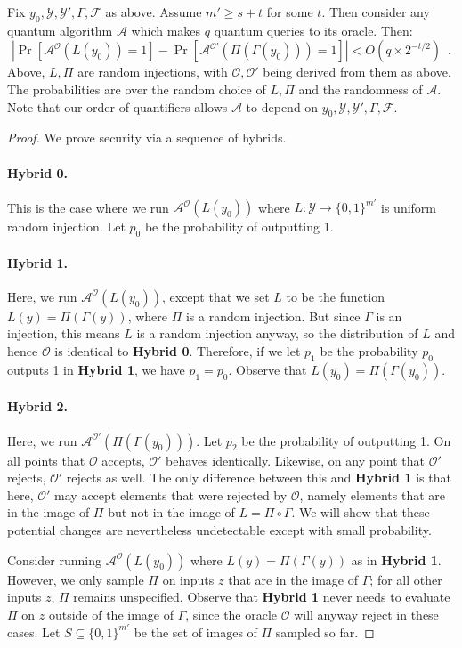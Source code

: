 \documentclass{article}\usepackage[a4paper,margin=20mm]{geometry}
\numberwithin{theorem}{section}
\numberwithin{equation}{section}
\newcommand{\As}{{\mathcal{A}}}
\newcommand{\Fs}{{\mathcal{F}}}
\newcommand{\Os}{{\mathcal{O}}}
\newcommand{\Ys}{{\mathcal{Y}}}
\begin{document}
\begin{lemma}\label{lem:ggamsim} Fix $y_0,\Ys,\Ys',\Gamma,\Fs$ as above. Assume $m'\geq s+t$ for some $t$. Then consider any quantum algorithm $\As$ which makes $q$ quantum queries to its oracle. Then:
	\[\left|\Pr\left[\As^{\Os}(L(y_0))=1\right]-\Pr\left[\As^{\Os'}(\Pi(\Gamma(y_0)))=1\right]\right|<O(q\times 2^{-t/2})\enspace .\]
	Above, $L,\Pi$ are random injections, with $\Os,\Os'$ being derived from them as above. The probabilities are over the random choice of $L,\Pi$ and the randomness of $\As$. Note that our order of quantifiers allows $\As$ to depend on $y_0,\Ys,\Ys',\Gamma,\Fs$.
\end{lemma}
\begin{proof}We prove security via a sequence of hybrids.
	\paragraph{Hybrid 0.} This is the case where we run $\As^{\Os}(L(y_0))$ where $L:\Ys\rightarrow\{0,1\}^{m'}$ is uniform random injection. Let $p_0$ be the probability of outputting 1.
	\paragraph{Hybrid 1.} Here, we run $\As^{\Os}(L(y_0))$, except that we set $L$ to be the function $L(y)=\Pi(\Gamma(y))$, where $\Pi$ is a random injection. But since $\Gamma$ is an injection, this means $L$ is a random injection anyway, so the distribution of $L$ and hence $\Os$ is identical to {\bf Hybrid 0}. Therefore, if we let $p_1$ be the probability $p_0$ outputs 1 in {\bf Hybrid 1}, we have $p_1=p_0$. Observe that $L(y_0)=\Pi(\Gamma(y_0))$.
	
	
	\paragraph{Hybrid 2.} Here, we run $\As^{\Os'}(\Pi(\Gamma(y_0)))$. Let $p_2$ be the probability of outputting 1. On all points that $\Os$ accepts, $\Os'$ behaves identically. Likewise, on any point that $\Os'$ rejects, $\Os'$ rejects as well. The only difference between this and {\bf Hybrid 1} is that here, $\Os'$ may accept elements that were rejected by $\Os$, namely elements that are in the image of $\Pi$ but not in the image of $L=\Pi\circ\Gamma$. We will show that these potential changes are nevertheless undetectable except with small probability.
	
	Consider running $\As^{\Os}(L(y_0))$ where $L(y)=\Pi(\Gamma(y))$ as in {\bf Hybrid 1}. However, we only sample $\Pi$ on inputs $z$ that are in the image of $\Gamma$; for all other inputs $z$, $\Pi$ remains unspecified. Observe that {\bf Hybrid 1} never needs to evaluate $\Pi$ on $z$ outside of the image of $\Gamma$, since the oracle $\Os$ will anyway reject in these cases. Let $S\subseteq\{0,1\}^{m'}$ be the set of images of $\Pi$ sampled so far.
	

\end{proof}
\end{document}
